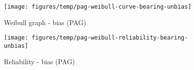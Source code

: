 \documentclass[fleqn]{article}
\begin{document}
\begin{figure}[!htb]
	\begin{minipage}[b]{0.5\linewidth}
		\centering
		\texttt{[image: figures/temp/pag-weibull-curve-bearing-unbias]}
		\caption{Weibull graph - bias (PAG)}
		\label{vil-weibull-graph-vil-bearing-unbias}
	\end{minipage}
	\hspace{0.05cm}
	\begin{minipage}[b]{0.5\linewidth}
		\centering
		\texttt{[image: figures/temp/pag-weibull-reliability-bearing-unbias]}
		\caption{Reliability - bias (PAG)}
		\label{vil-weibull-graph-vil-reliability-unbias}
	\end{minipage}
\end{figure}

	
	 
	


	
\end{document}
